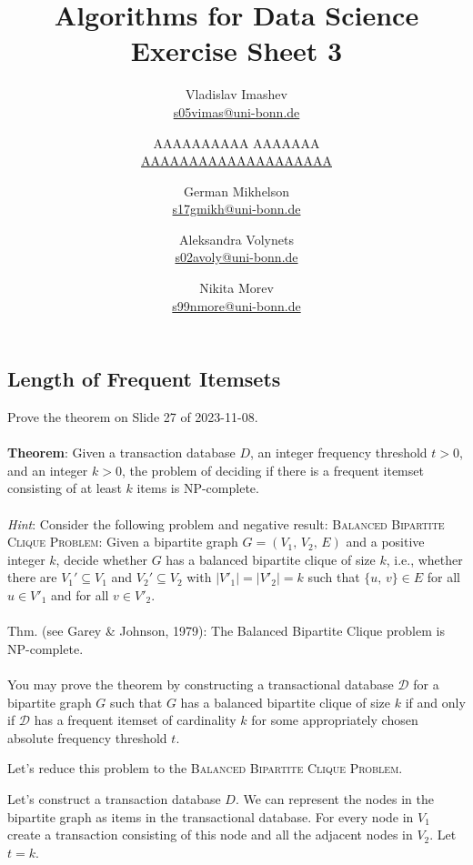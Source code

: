 \documentclass{article}
\title{Algorithms for Data Science \\ Exercise Sheet 3}
\author{
  Vladislav Imashev \\ \href{mailto:s05vimas@uni-bonn.de}{s05vimas@uni-bonn.de} \and
  AAAAAAAAAA AAAAAAA \\ \href{mailto:AAAAAAAAAAAAAAAAAAAA}{AAAAAAAAAAAAAAAAAAAA} \and
  German Mikhelson \\ \href{mailto:s17gmikh@uni-bonn.de}{s17gmikh@uni-bonn.de} \and
  Aleksandra Volynets \\ \href{mailto:s02avoly@uni-bonn.de}{s02avoly@uni-bonn.de} \and
  Nikita Morev \\ \href{mailto:s99nmore@uni-bonn.de}{s99nmore@uni-bonn.de}
}
\begin{document}
  \maketitle

  \setcounter{section}{3}
  \subsection{Length of Frequent Itemsets}
  \begin{centerframebox}
    Prove the theorem on Slide 27 of 2023-11-08.
    \\\\
    \textbf{Theorem}:
    Given a transaction database $D$, an integer frequency threshold $t > 0$, and an integer $k > 0$,
    the problem of deciding if there is a frequent itemset consisting of at least $k$ items is NP-complete.
    \\\\
    \textit{Hint}: Consider the following problem and negative result:
    \textsc{Balanced Bipartite Clique Problem}:
    Given a bipartite graph $G = (V_1,\, V_2,\, E)$ and a positive integer $k$, decide whether $G$ has a balanced
    bipartite clique of size $k$, i.e., whether there are $V_1' \subseteq V_1$ and $V_2' \subseteq V_2$
    with $|V'_1| = |V'_2| = k$ such that $\{u,\, v\} \in E$ for all $u \in V'_1$ and for all $v \in V'_2$.
    \\\\
    Thm. (see Garey \& Johnson, 1979): The Balanced Bipartite Clique problem is NP-complete.
    \\\\
    You may prove the theorem by constructing a transactional database $\mathcal{D}$
    for a bipartite graph $G$ such that $G$ has a balanced bipartite clique of
    size $k$ if and only if $\mathcal{D}$ has a frequent itemset of cardinality $k$ for some
    appropriately chosen absolute frequency threshold $t$.
  \end{centerframebox}
  Let's reduce this problem to the \textsc{Balanced Bipartite Clique Problem}.

  Let's construct a transaction database $D$. We can represent the nodes in the bipartite graph as items in the transactional database. For every node in $V_1$ create a transaction consisting of this node and all the adjacent nodes in $V_2$. Let $t = k$.
\end{document}
